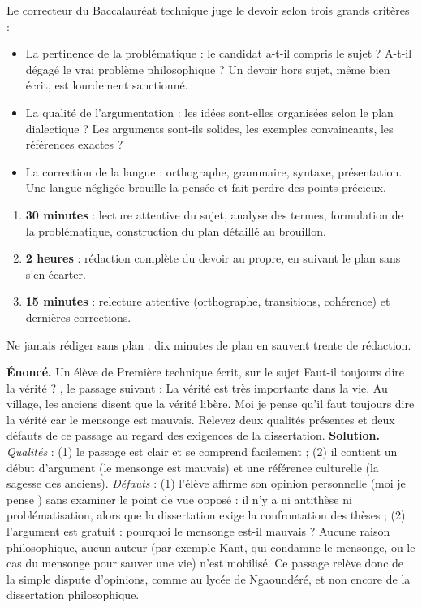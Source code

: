 \documentclass[11pt]{article}
\newcommand{\cle}[1]{{\popxbold\color{popdark}#1}}
\newcounter{popsec}
\newcounter{popsub}
\newcommand{\courssub}[1]{%
  \stepcounter{popsub}%
  \par\vspace{9pt}\noindent{\popxbold\fontsize{11.5}{13}\selectfont\color{popink}{\color{poporange}\thepopsec.\thepopsub}\hspace{6pt}#1}\par\nopagebreak\vspace{4pt}
}
\begin{document}
\courssub{Les critères d'évaluation au Baccalauréat}

Le correcteur du Baccalauréat technique juge le devoir selon trois grands critères :

\begin{itemize}
\item La \cle{pertinence de la problématique} : le candidat a-t-il compris le sujet ? A-t-il dégagé le vrai problème philosophique ? Un devoir hors sujet, même bien écrit, est lourdement sanctionné.
\item La \cle{qualité de l'argumentation} : les idées sont-elles organisées selon le plan dialectique ? Les arguments sont-ils solides, les exemples convaincants, les références exactes ?
\item La \cle{correction de la langue} : orthographe, grammaire, syntaxe, présentation. Une langue négligée brouille la pensée et fait perdre des points précieux.
\end{itemize}

\begin{methode}
\begin{enumerate}
\item \textbf{30 minutes} : lecture attentive du sujet, analyse des termes, formulation de la problématique, construction du plan détaillé au brouillon.
\item \textbf{2 heures} : rédaction complète du devoir au propre, en suivant le plan sans s'en écarter.
\item \textbf{15 minutes} : relecture attentive (orthographe, transitions, cohérence) et dernières corrections.
\end{enumerate}
Ne jamais rédiger sans plan : dix minutes de plan en sauvent trente de rédaction.
\end{methode}

\begin{exoresolu}
\textbf{Énoncé.} Un élève de Première technique écrit, sur le sujet \og Faut-il toujours dire la vérité ? \fg{}, le passage suivant : \og La vérité est très importante dans la vie. Au village, les anciens disent que la vérité libère. Moi je pense qu'il faut toujours dire la vérité car le mensonge est mauvais. \fg{} Relevez deux qualités présentes et deux défauts de ce passage au regard des exigences de la dissertation.
\tcblower
\textbf{Solution.} \emph{Qualités} : (1) le passage est clair et se comprend facilement ; (2) il contient un début d'argument (le mensonge est mauvais) et une référence culturelle (la sagesse des anciens). \emph{Défauts} : (1) l'élève affirme son opinion personnelle (\og moi je pense \fg{}) sans examiner le point de vue opposé : il n'y a ni antithèse ni problématisation, alors que la dissertation exige la confrontation des thèses ; (2) l'argument est gratuit : pourquoi le mensonge est-il mauvais ? Aucune raison philosophique, aucun auteur (par exemple Kant, qui condamne le mensonge, ou le cas du mensonge pour sauver une vie) n'est mobilisé. Ce passage relève donc de la simple dispute d'opinions, comme au lycée de Ngaoundéré, et non encore de la dissertation philosophique.
\end{exoresolu}
\end{document}
